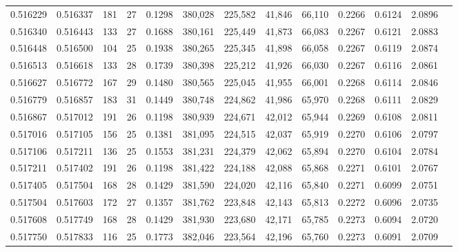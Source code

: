 \begin{tabular}{rrrrrrrrrrrrr}
0.516229 & 0.516337 &   181 &  27 &                                     0.1298 & 380,028 & 225,582 &  41,846 &  66,110 & 0.2266 & 0.6124 & 2.0896 \\
0.516340 & 0.516443 &   133 &  27 &                                     0.1688 & 380,161 & 225,449 &  41,873 &  66,083 & 0.2267 & 0.6121 & 2.0883 \\
0.516448 & 0.516500 &   104 &  25 &                                     0.1938 & 380,265 & 225,345 &  41,898 &  66,058 & 0.2267 & 0.6119 & 2.0874 \\
0.516513 & 0.516618 &   133 &  28 &                                     0.1739 & 380,398 & 225,212 &  41,926 &  66,030 & 0.2267 & 0.6116 & 2.0861 \\
0.516627 & 0.516772 &   167 &  29 &                                     0.1480 & 380,565 & 225,045 &  41,955 &  66,001 & 0.2268 & 0.6114 & 2.0846 \\
0.516779 & 0.516857 &   183 &  31 &                                     0.1449 & 380,748 & 224,862 &  41,986 &  65,970 & 0.2268 & 0.6111 & 2.0829 \\
0.516867 & 0.517012 &   191 &  26 &                                     0.1198 & 380,939 & 224,671 &  42,012 &  65,944 & 0.2269 & 0.6108 & 2.0811 \\
0.517016 & 0.517105 &   156 &  25 &                                     0.1381 & 381,095 & 224,515 &  42,037 &  65,919 & 0.2270 & 0.6106 & 2.0797 \\
0.517106 & 0.517211 &   136 &  25 &                                     0.1553 & 381,231 & 224,379 &  42,062 &  65,894 & 0.2270 & 0.6104 & 2.0784 \\
0.517211 & 0.517402 &   191 &  26 &                                     0.1198 & 381,422 & 224,188 &  42,088 &  65,868 & 0.2271 & 0.6101 & 2.0767 \\
0.517405 & 0.517504 &   168 &  28 &                                     0.1429 & 381,590 & 224,020 &  42,116 &  65,840 & 0.2271 & 0.6099 & 2.0751 \\
0.517504 & 0.517603 &   172 &  27 &                                     0.1357 & 381,762 & 223,848 &  42,143 &  65,813 & 0.2272 & 0.6096 & 2.0735 \\
0.517608 & 0.517749 &   168 &  28 &                                     0.1429 & 381,930 & 223,680 &  42,171 &  65,785 & 0.2273 & 0.6094 & 2.0720 \\
0.517750 & 0.517833 &   116 &  25 &                                     0.1773 & 382,046 & 223,564 &  42,196 &  65,760 & 0.2273 & 0.6091 & 2.0709 \\

\end{tabular}

